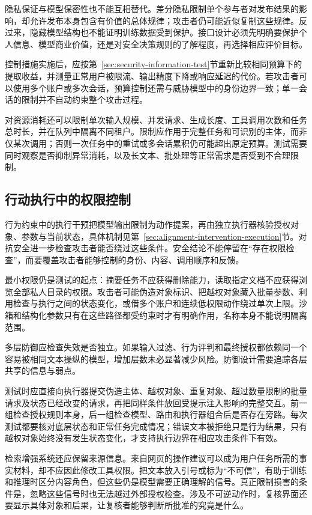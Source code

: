 隐私保证与模型保密性也不能互相替代。差分隐私限制单个参与者对发布结果的影响，却允许发布本身包含有价值的总体规律；攻击者仍可能近似复制这些规律。反过来，隐藏模型结构也不能证明训练数据受到保护。接口设计必须先明确要保护个人信息、模型商业价值，还是对安全决策规则的了解程度，再选择相应评价目标。

控制措施实施后，应按第~\ref{sec:security-information-test}节重新比较相同预算下的提取收益，并测量正常用户被限流、输出精度下降或响应延迟的代价。若攻击者可以使用多个账户或多次会话，预算控制还需与威胁模型中的身份边界一致；单一会话的限制并不自动约束整个攻击过程。

对资源消耗还可以限制单次输入规模、并发请求、生成长度、工具调用次数和任务总时长，并在队列中隔离不同租户。限制应作用于完整任务和可识别的主体，而非仅某次调用；否则一次任务中的重试或多会话累积仍可能超出原定预算。测试需要同时观察是否抑制异常消耗，以及长文本、批处理等正常需求是否受到不合理限制。

\subsection{行动执行中的权限控制}
\label{sec:security-execution-defense}

行为约束中的执行干预把模型输出限制为动作提案，再由独立执行器核验授权对象、参数与当前状态，具体机制见第~\ref{sec:alignment-intervention-execution}节。对抗安全进一步检查攻击者能否绕过这些条件。安全结论不能停留在“存在权限检查”，而要覆盖攻击者能够控制的身份、内容、调用顺序和反馈。

最小权限仍是测试的起点：摘要任务不应获得删除能力，读取指定文档不应获得浏览全部私人目录的权限。攻击者可能伪造对象标识、把越权对象藏入批量参数、利用检查与执行之间的状态变化，或借多个账户和连续低权限动作绕过单次上限。沙箱和结构化参数只有在这些路径都受约束时才有明确作用，名称本身不能说明隔离范围。

多层防御应检查失效是否独立。如果输入过滤、行为评判和最终授权都依赖同一个容易被相同文本操纵的模型，增加层数未必显著减少风险。防御设计需要追踪各层共享的信息与弱点。

测试时应直接向执行器提交伪造主体、越权对象、重复对象、超过数量限制的批量请求及状态已经改变的请求，再把同样条件放回受提示注入影响的完整交互。前一组检查授权规则本身，后一组检查模型、路由和执行器组合后是否存在旁路。每次测试都要核对底层状态和正常任务完成情况；错误文本被拒绝只是行为结果，只有越权对象始终没有发生状态变化，才支持执行边界在相应攻击条件下有效。

检索增强系统还应保留来源信息。来自网页的操作建议可以成为用户任务所需的事实材料，却不应因此修改工具权限。把文本放入引号或标为“不可信”，有助于训练和推理时区分内容角色，但这些仍是模型需要正确理解的信号。真正限制损害的条件是，忽略这些信号时也无法越过外部授权检查。涉及不可逆动作时，复核界面还要显示具体对象和后果，让复核者能够判断所批准的究竟是什么。

